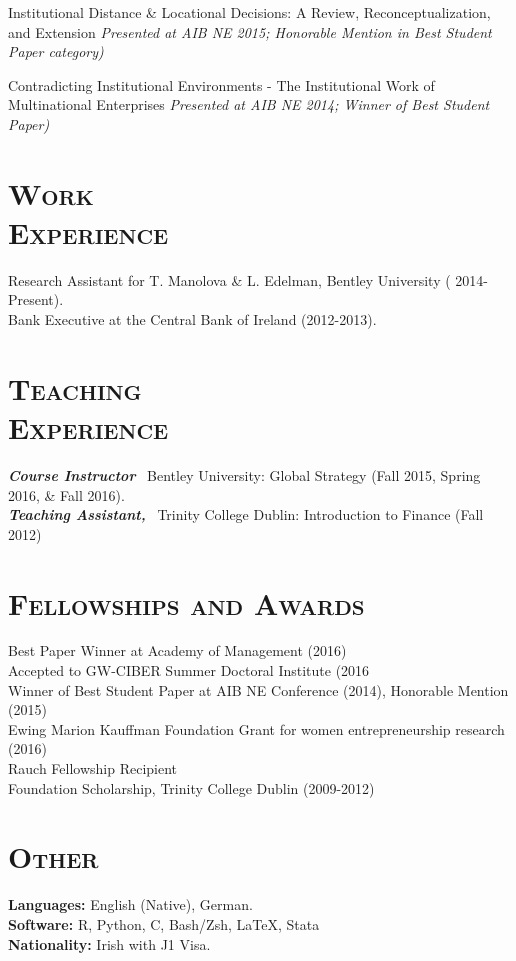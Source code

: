 \documentclass[margin, 10pt]{res}
\begin{document}
\begin{resume}
Institutional Distance \& Locational Decisions: A Review, Reconceptualization,
and Extension \textit{ Presented at AIB NE 2015; Honorable Mention in Best Student Paper category)}

Contradicting Institutional Environments - The Institutional Work of
Multinational Enterprises \textit{ Presented at AIB NE 2014; Winner of Best Student Paper)}



\section{\normalfont\textsc{Work \\Experience}}
Research Assistant for T. Manolova \& L. Edelman, Bentley University ( 2014-Present). \\
[0.5em]
Bank Executive at the Central Bank of Ireland (2012-2013). 


\section{\normalfont\textsc{Teaching \\Experience}}
\textbf{\textit{Course Instructor}}~ Bentley University:
Global Strategy (Fall 2015, Spring 2016, \& Fall
2016). \\
\textbf{\textit{Teaching Assistant,}}~ Trinity College Dublin:
Introduction to Finance (Fall 2012)


\section{\normalfont\textsc{Fellowships and Awards}}
Best Paper Winner at Academy of Management (2016) \\
[0.5em]
Accepted to GW-CIBER Summer Doctoral Institute (2016 \\ 
[0.5em]
Winner of Best Student Paper at AIB NE Conference (2014), Honorable Mention (2015) \\
[0.5em]
Ewing Marion Kauffman Foundation Grant for women entrepreneurship research (2016) \\
[0.5em]
Rauch Fellowship Recipient \\
[0.5em]
Foundation Scholarship, Trinity College Dublin (2009-2012) \\

\section{\normalfont\textsc{Other}}
\textbf{Languages:} English (Native), German.\\
\textbf{Software:} R, Python, C, Bash/Zsh, \LaTeX, Stata \\
\textbf{Nationality:} Irish with J1 Visa.

\end{resume}
\end{document}
